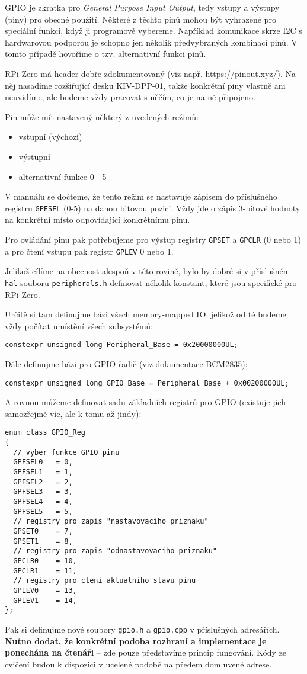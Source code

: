 \documentclass{article}
\begin{document}
GPIO je zkratka pro \emph{General Purpose Input Output}, tedy vstupy a výstupy (piny) pro obecné použití. Některé z těchto pinů mohou být vyhrazené pro speciální funkci, když ji programově vybereme. Například komunikace skrze I2C s hardwarovou podporou je schopno jen několik předvybraných kombinací pinů. V tomto případě hovoříme o tzv. alternativní funkci pinů.

RPi Zero má header dobře zdokumentovaný (viz např. \url{https://pinout.xyz/}). Na něj nasadíme rozšiřující desku KIV-DPP-01, takže konkrétní piny vlastně ani neuvidíme, ale budeme vždy pracovat s něčím, co je na ně připojeno.

Pin může mít nastavený některý z uvedených režimů:
\begin{itemize}
	\item vstupní (výchozí)
	\item výstupní
	\item alternativní funkce 0 - 5
\end{itemize}

V manuálu se dočteme, že tento režim se nastavuje zápisem do příslušného registru \texttt{GPFSEL} (0-5) na danou bitovou pozici. Vždy jde o zápis 3-bitové hodnoty na konkrétní místo odpovídající konkrétnímu pinu.

Pro ovládání pinu pak potřebujeme pro výstup registry \texttt{GPSET} a \texttt{GPCLR} (0 nebo 1) a pro čtení vstupu pak registr \texttt{GPLEV} 0 nebo 1.

Jelikož cílíme na obecnost alespoň v této rovině, bylo by dobré si v příslušném \texttt{hal} souboru \texttt{peripherals.h} definovat několik konstant, které jsou specifické pro RPi Zero.

Určitě si tam definujme bázi všech memory-mapped IO, jelikož od té budeme vždy počítat umístění všech subsystémů:
\begin{lstlisting}
constexpr unsigned long Peripheral_Base = 0x20000000UL;
\end{lstlisting}
Dále definujme bázi pro GPIO řadič (viz dokumentace BCM2835):
\begin{lstlisting}
constexpr unsigned long GPIO_Base = Peripheral_Base + 0x00200000UL;
\end{lstlisting}
A rovnou můžeme definovat sadu základních registrů pro GPIO (existuje jich samozřejmě víc, ale k tomu až jindy):
\begin{lstlisting}
enum class GPIO_Reg
{
  // vyber funkce GPIO pinu
  GPFSEL0   = 0,
  GPFSEL1   = 1,
  GPFSEL2   = 2,
  GPFSEL3   = 3,
  GPFSEL4   = 4,
  GPFSEL5   = 5,
  // registry pro zapis "nastavovaciho priznaku"
  GPSET0    = 7,
  GPSET1    = 8,
  // registry pro zapis "odnastavovaciho priznaku"
  GPCLR0    = 10,
  GPCLR1    = 11,
  // registry pro cteni aktualniho stavu pinu
  GPLEV0    = 13,
  GPLEV1    = 14,
};
\end{lstlisting}
Pak si definujme nové soubory \texttt{gpio.h} a \texttt{gpio.cpp} v příslušných adresářích. \textbf{Nutno dodat, že konkrétní podoba rozhraní a implementace je ponechána na čtenáři} -- zde pouze představíme princip fungování. Kódy ze cvičení budou k dispozici v ucelené podobě na předem domluvené adrese.
\end{document}
